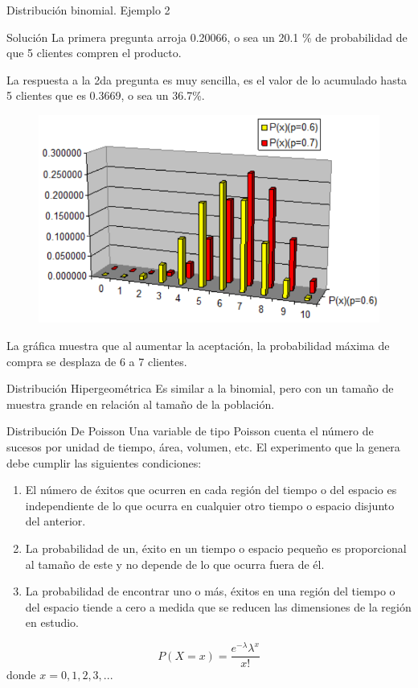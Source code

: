 \documentclass[11pt]{beamer}
\begin{document}
          \begin{frame}{Distribución binomial. Ejemplo 2}

              \begin{block}{Solución}
                  La primera pregunta arroja 0.20066, o sea un 20.1 \% de probabilidad de que 5 clientes compren el producto.

                  La respuesta a la 2da pregunta es muy sencilla, es el valor de lo acumulado hasta 5 clientes que es 0.3669, o sea un 36.7\%.
              \end{block}
              \vspace{-0.23cm}
                  \begin{figure}
                      \centering
                      \includegraphics[width=0.5\linewidth]{images/estadistica9}
                      \label{fig:estadistica9}
                  \end{figure}
              \vspace{-0.23cm}
              La gráfica muestra que al aumentar la aceptación, la probabilidad máxima de compra se desplaza de 6 a 7 clientes.
          \end{frame}

          \begin{frame}{Distribución Hipergeométrica}
            Es similar a la binomial, pero con un tamaño de muestra grande en relación al tamaño de la población.
          \end{frame}

          \begin{frame}{Distribución De Poisson}
              Una variable de tipo Poisson cuenta el número de sucesos por unidad de tiempo, área, volumen, etc.  El experimento que la genera debe cumplir las siguientes condiciones:
              \begin{enumerate}
                  \item El número de éxitos que ocurren en cada región del tiempo o del espacio es independiente de lo que ocurra en cualquier otro tiempo o espacio disjunto del anterior.
                  \item La probabilidad de un‚ éxito en un tiempo o espacio pequeño es proporcional al tamaño de este y no depende de lo que ocurra fuera de él.
                  \item La probabilidad de encontrar uno o más‚ éxitos en una región del tiempo o del espacio tiende a cero a medida que se reducen las dimensiones de la región en estudio.
              \end{enumerate}
          $$ P(X=x)=\dfrac{e^{-\lambda}\lambda^x}{x!} $$
          donde $x = 0, 1, 2, 3, ...$

          \end{frame}
\end{document}
